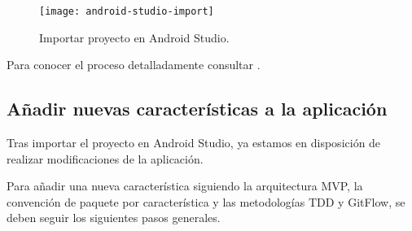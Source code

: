 \begin{figure}[H]
	\centering
	\texttt{[image: android-studio-import]}
	\caption{Importar proyecto en Android Studio.}\label{fig:android-studio-import}
\end{figure}

Para conocer el proceso detalladamente consultar \citep{android:import}.

\subsection{Añadir nuevas características a la
aplicación}\label{anadir-nuevas-caracteristicas-a-la-aplicacion}

Tras importar el proyecto en Android Studio, ya estamos en disposición
de realizar modificaciones de la aplicación.

Para añadir una nueva característica siguiendo la arquitectura MVP, la
convención de paquete por característica y las metodologías TDD y
GitFlow, se deben seguir los siguientes pasos generales.

